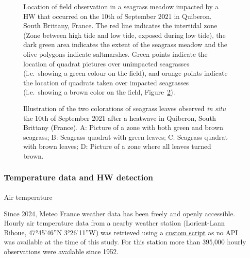 \documentclass[
  letterpaper,
  11pt,
  english,
  singlespacing,
  headsepline]{MastersDoctoralThesis}
\makeatletter
\let\oldparagraph\paragraph
\renewcommand{\paragraph}{
    \@ifstar
      \xxxParagraphStar
      \xxxParagraphNoStar
  }
\newcommand{\xxxParagraphStar}[1]{\oldparagraph*{#1}\mbox{}}
\newcommand{\xxxParagraphNoStar}[1]{\oldparagraph{#1}\mbox{}}
\makeatother
\begin{document}
\begin{spacing}{1.5}
\begin{figure}


\caption{\label{fig-quiberonMap_h}Location of field observation in a
seagrass meadow impacted by a HW that occurred on the 10th of September
2021 in Quiberon, South Brittany, France. The red line indicates the
intertidal zone (Zone between high tide and low tide, exposed during low
tide), the dark green area indicates the extent of the seagrass meadow
and the olive polygons indicate saltmarshes. Green points indicate the
location of quadrat pictures over unimpacted seagrasses (i.e.~showing a
green colour on the field), and orange points indicate the location of
quadrats taken over impacted seagrasses (i.e.~showing a brown color on
the field, Figure~\ref{fig-QuiberonImg_h}).}

\end{figure}%

\begin{figure}


\caption{\label{fig-QuiberonImg_h}Illustration of the two colorations of
seagrass leaves observed \emph{in situ} the 10th of September 2021 after
a heatwave in Quiberon, South Brittany (France). A: Picture of a zone
with both green and brown seagrass; B: Seagrass quadrat with green
leaves; C: Seagrass quadrat with brown leaves; D: Picture of a zone
where all leaves turned brown.}

\end{figure}%

\subsubsection{Temperature data and HW
detection}\label{temperature-data-and-hw-detection}

\paragraph{Air temperature}\label{air-temperature}

Since 2024, Meteo France weather data has been freely and openly
accessible. Hourly air temperature data from a nearby weather station
(Lorient-Lann Bihoue, 47°45'46''N 3°26'11''W) was retrieved using a
\href{https://github.com/SigOiry/HeatWave_Seagrasses/blob/main/Scripts/MeteoFrance_Extraction.qmd}{custom
script} as no API was available at the time of this study. For this
station more than 395,000 hourly observations were available since 1952.


\end{spacing}
\end{document}
